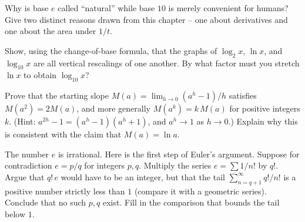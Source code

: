 \begin{exercise}[Conceptual]
Why is base $e$ called ``natural'' while base $10$ is merely convenient for humans? Give two distinct reasons drawn from this chapter -- one about derivatives and one about the area under $1/t$.
\end{exercise}

\begin{exercise}
Show, using the change-of-base formula, that the graphs of $\log_2 x$, $\ln x$, and $\log_{10}x$ are all vertical rescalings of one another. By what factor must you stretch $\ln x$ to obtain $\log_{10}x$?
\end{exercise}

\begin{exercise}[Proof]
Prove that the starting slope $M(a)=\lim_{h\to0}(a^h-1)/h$ satisfies $M(a^2)=2M(a)$, and more generally $M(a^k)=k\,M(a)$ for positive integers $k$. (Hint: $a^{2h}-1 = (a^h-1)(a^h+1)$, and $a^h\to 1$ as $h\to 0$.) Explain why this is consistent with the claim that $M(a)=\ln a$.
\end{exercise}

\begin{exercise}[Challenge]
The number $e$ is irrational. Here is the first step of Euler's argument. Suppose for contradiction $e=p/q$ for integers $p,q$. Multiply the series $e=\sum 1/n!$ by $q!$. Argue that $q!\,e$ would have to be an integer, but that the tail $\sum_{n=q+1}^{\infty} q!/n!$ is a positive number strictly less than $1$ (compare it with a geometric series). Conclude that no such $p,q$ exist. Fill in the comparison that bounds the tail below $1$.
\end{exercise}
